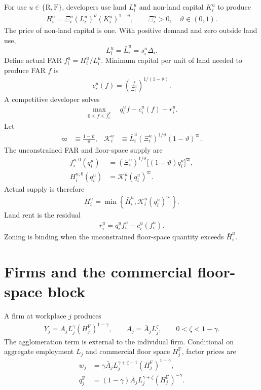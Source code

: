 \documentclass[12pt,a4paper]{article}
\newcommand{\R}{\mathrm{R}}
\newcommand{\F}{\mathrm{F}}
\newcommand{\1}{\mathbb 1}
\begin{document}
For use $u\in\{\R,\F\}$, developers use land $L_i^u$ and non-land capital $K_i^u$ to produce
\begin{align}
H_i^u
=
\Xi_i^u(L_i^u)^{\vartheta}(K_i^u)^{1-\vartheta},
\qquad
\Xi_i^u>0,
\quad
\vartheta\in(0,1).
\label{eq:construction}
\end{align}
The price of non-land capital is one. With positive demand and zero outside land use,
\[
L_i^u=\bar L_i^u=s_i^u\Delta_i.
\]
Define actual FAR $f_i^u=H_i^u/L_i^u$. Minimum capital per unit of land needed to produce FAR $f$ is
\begin{align}
c_i^u(f)
=
\left(\frac{f}{\Xi_i^u}\right)^{1/(1-\vartheta)}.
\label{eq:construction-cost}
\end{align}
A competitive developer solves
\begin{align}
\max_{0\leq f\leq\bar f_i^u}
\quad
q_i^u f-c_i^u(f)-r_i^u.
\label{eq:developer-problem}
\end{align}
Let
\begin{align}
\varpi
&\equiv\frac{1-\vartheta}{\vartheta},
&
\mathcal K_i^u
&\equiv
\bar L_i^u(\Xi_i^u)^{1/\vartheta}(1-\vartheta)^{\varpi}.
\label{eq:supply-constants}
\end{align}
The unconstrained FAR and floor-space supply are
\begin{align}
f_i^{u,0}(q_i^u)
&=
(\Xi_i^u)^{1/\vartheta}
\bigl[(1-\vartheta)q_i^u\bigr]^{\varpi},
\label{eq:far-unconstrained}\\
H_i^{u,0}(q_i^u)
&=
\mathcal K_i^u(q_i^u)^{\varpi}.
\label{eq:supply-unconstrained}
\end{align}
Actual supply is therefore
\begin{align}
H_i^u
=
\min\left\{
\bar H_i^u,
\mathcal K_i^u(q_i^u)^{\varpi}
\right\}.
\label{eq:floorspace-supply}
\end{align}
Land rent is the residual
\begin{align}
r_i^u=q_i^uf_i^u-c_i^u(f_i^u).
\label{eq:land-rent}
\end{align}
Zoning is binding when the unconstrained floor-space quantity exceeds $\bar H_i^u$.

\section{Firms and the commercial floor-space block}

A firm at workplace $j$ produces
\begin{align}
Y_j=A_jL_j^{\gamma}(H_j^{\F})^{1-\gamma},
\qquad
A_j=\bar A_jL_j^{\zeta},
\qquad
0<\zeta<1-\gamma.
\label{eq:firm-production}
\end{align}
The agglomeration term is external to the individual firm. Conditional on aggregate employment $L_j$ and commercial floor space $H_j^{\F}$, factor prices are
\begin{align}
w_j
&=
\gamma\bar A_jL_j^{\gamma+\zeta-1}
(H_j^{\F})^{1-\gamma},
\label{eq:wage}\\
q_j^{\F}
&=
(1-\gamma)\bar A_jL_j^{\gamma+\zeta}
(H_j^{\F})^{-\gamma}.
\label{eq:commercial-rent}
\end{align}
\end{document}
